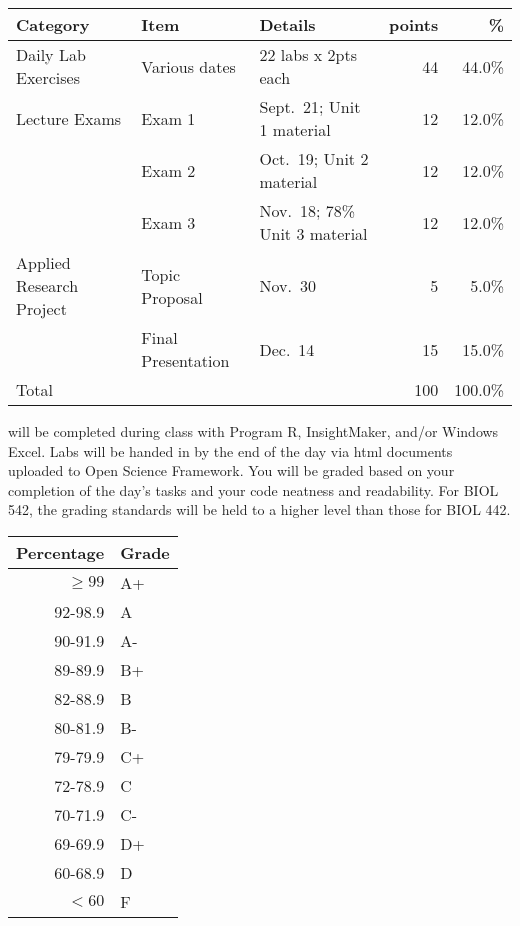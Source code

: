\documentclass{tufte-handout}
\begin{document}

\begin{fullwidth}



\begin{table}
\begin{tabular}{l l l r r}
Category & Item & Details & points & \% \\
\hline
Daily Lab Exercises & Various dates & 22 labs x 2pts each & 44 & 44.0\% \\
\hline
Lecture Exams & Exam 1 & Sept.~21; Unit 1 material & 12 & 12.0\% \\
& Exam 2 & Oct.~19; Unit 2 material & 12 & 12.0\% \\
& Exam 3 & Nov.~18; 78\% Unit 3 material & 12 & 12.0\% \\ 		
\hline
Applied Research Project & Topic Proposal & Nov.~30 & 5 & 5.0\% \\
& Final Presentation & Dec.~14 & 15 & 15.0\% \\
\hline
Total & & & 100 & 100.0\% 
\end{tabular}
\end{table}

\end{fullwidth}

 will be completed during class with Program R, InsightMaker, and/or Windows Excel. Labs will be handed in by the end of the day via html documents uploaded to Open Science Framework. You will be graded based on your completion of the day's tasks and your code neatness and readability. For BIOL 542, the grading standards will be held to a higher level than those for BIOL 442. 



\begin{margintable}
\begin{tabular}{rl}
Percentage & Grade \\
\hline 
$\ge99$ & A+ \\
92-98.9 & A \\
90-91.9 & A- \\
89-89.9 & B+ \\
82-88.9 & B \\
80-81.9 & B- \\
79-79.9 & C+ \\
72-78.9 & C \\
70-71.9 & C- \\
69-69.9 & D+ \\
60-68.9 & D \\
$<60$ & F \\
\hline
\end{tabular}
\end{margintable}
\end{document}
